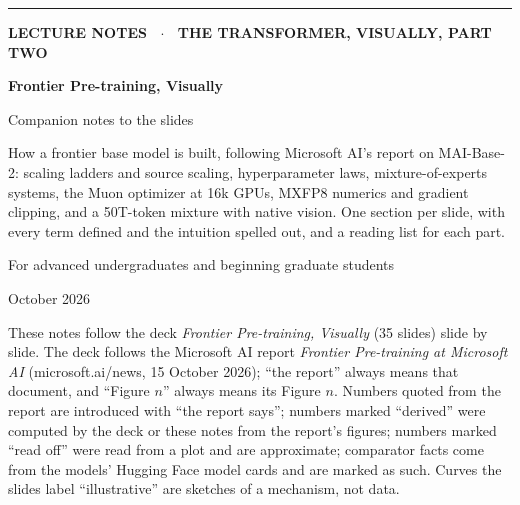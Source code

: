 \documentclass[11pt,letterpaper]{article}
\begin{document}
\begin{titlepage}
\thispagestyle{empty}
\vspace*{2.5cm}
{\color{attn}\rule{3cm}{3pt}}\par\vspace{0.6cm}
{\sffamily\bfseries\color{muted}\large LECTURE NOTES \ $\cdot$ \ THE TRANSFORMER, VISUALLY, PART TWO\par}
\vspace{0.4cm}
{\sffamily\bfseries\fontsize{34}{38}\selectfont\color{ink} Frontier Pre-training, Visually\par}
\vspace{0.3cm}
{\sffamily\fontsize{18}{22}\selectfont\color{ink} Companion notes to the slides\par}
\vspace{1.2cm}
{\large\color{muted}\parbox{0.82\textwidth}{How a frontier base model is built, following Microsoft AI's report on MAI-Base-2: scaling ladders and source scaling, hyperparameter laws, mixture-of-experts systems, the Muon optimizer at 16k GPUs, MXFP8 numerics and gradient clipping, and a 50T-token mixture with native vision. One section per slide, with every term defined and the intuition spelled out, and a reading list for each part.}\par}
\vspace{1.5cm}
{\color{muted}For advanced undergraduates and beginning graduate students\par}
\vspace{0.3cm}
{\color{muted}October 2026\par}
\vfill
{\small\color{muted}\parbox{0.9\textwidth}{These notes follow the deck \textit{Frontier Pre-training, Visually} (35 slides) slide by slide. The deck follows the Microsoft AI report \textit{Frontier Pre-training at Microsoft AI} (microsoft.ai/news, 15 October 2026); ``the report'' always means that document, and ``Figure $n$'' always means its Figure $n$. Numbers quoted from the report are introduced with ``the report says''; numbers marked ``derived'' were computed by the deck or these notes from the report's figures; numbers marked ``read off'' were read from a plot and are approximate; comparator facts come from the models' Hugging Face model cards and are marked as such. Curves the slides label ``illustrative'' are sketches of a mechanism, not data.}\par}
\end{titlepage}
\end{document}
